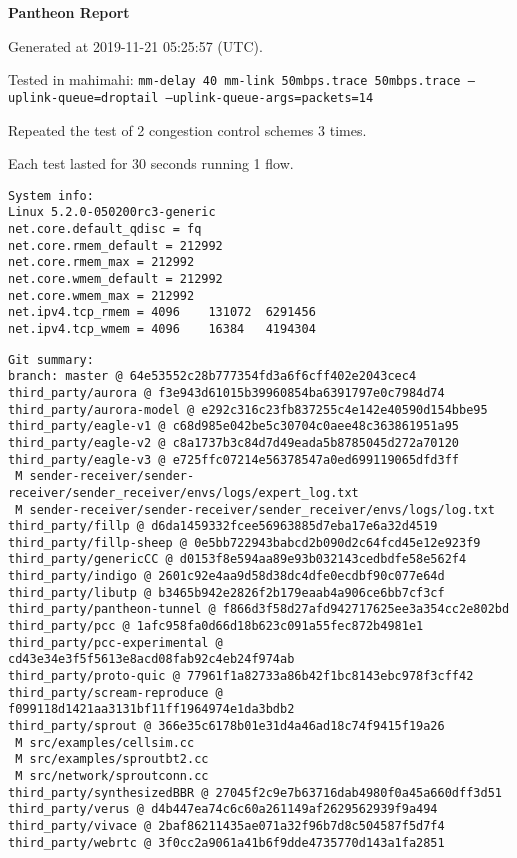 \documentclass{article}
\begin{document}
\centerline{\textbf{\large{Pantheon Report}}}
\vspace{20pt}

Generated at 2019-11-21 05:25:57 (UTC).

Tested in mahimahi: \texttt{mm-delay 40 mm-link 50mbps.trace 50mbps.trace --uplink-queue=droptail --uplink-queue-args=packets=14}

Repeated the test of 2 congestion control schemes 3 times.

Each test lasted for 30 seconds running 1 flow.

\begin{verbatim}
System info:
Linux 5.2.0-050200rc3-generic
net.core.default_qdisc = fq
net.core.rmem_default = 212992
net.core.rmem_max = 212992
net.core.wmem_default = 212992
net.core.wmem_max = 212992
net.ipv4.tcp_rmem = 4096	131072	6291456
net.ipv4.tcp_wmem = 4096	16384	4194304
\end{verbatim}

\begin{verbatim}
Git summary:
branch: master @ 64e53552c28b777354fd3a6f6cff402e2043cec4
third_party/aurora @ f3e943d61015b39960854ba6391797e0c7984d74
third_party/aurora-model @ e292c316c23fb837255c4e142e40590d154bbe95
third_party/eagle-v1 @ c68d985e042be5c30704c0aee48c363861951a95
third_party/eagle-v2 @ c8a1737b3c84d7d49eada5b8785045d272a70120
third_party/eagle-v3 @ e725ffc07214e56378547a0ed699119065dfd3ff
 M sender-receiver/sender-receiver/sender_receiver/envs/logs/expert_log.txt
 M sender-receiver/sender-receiver/sender_receiver/envs/logs/log.txt
third_party/fillp @ d6da1459332fcee56963885d7eba17e6a32d4519
third_party/fillp-sheep @ 0e5bb722943babcd2b090d2c64fcd45e12e923f9
third_party/genericCC @ d0153f8e594aa89e93b032143cedbdfe58e562f4
third_party/indigo @ 2601c92e4aa9d58d38dc4dfe0ecdbf90c077e64d
third_party/libutp @ b3465b942e2826f2b179eaab4a906ce6bb7cf3cf
third_party/pantheon-tunnel @ f866d3f58d27afd942717625ee3a354cc2e802bd
third_party/pcc @ 1afc958fa0d66d18b623c091a55fec872b4981e1
third_party/pcc-experimental @ cd43e34e3f5f5613e8acd08fab92c4eb24f974ab
third_party/proto-quic @ 77961f1a82733a86b42f1bc8143ebc978f3cff42
third_party/scream-reproduce @ f099118d1421aa3131bf11ff1964974e1da3bdb2
third_party/sprout @ 366e35c6178b01e31d4a46ad18c74f9415f19a26
 M src/examples/cellsim.cc
 M src/examples/sproutbt2.cc
 M src/network/sproutconn.cc
third_party/synthesizedBBR @ 27045f2c9e7b63716dab4980f0a45a660dff3d51
third_party/verus @ d4b447ea74c6c60a261149af2629562939f9a494
third_party/vivace @ 2baf86211435ae071a32f96b7d8c504587f5d7f4
third_party/webrtc @ 3f0cc2a9061a41b6f9dde4735770d143a1fa2851
\end{verbatim}
\end{document}
